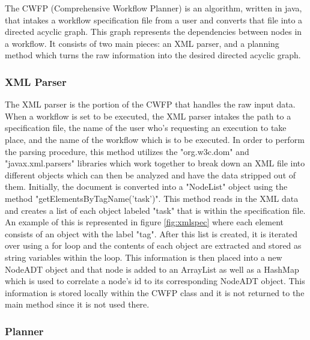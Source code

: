 \documentclass[fleqn,10pt]{SelfArx} %
\begin{document}
The CWFP (Comprehensive Workflow Planner) is an algorithm, written in java, that intakes a workflow specification file from a user and converts that file into a directed acyclic graph. This graph represents the dependencies between nodes in a workflow. It consists of two main pieces: an XML parser, and a planning method which turns the raw information into the desired directed acyclic graph.

\subsubsection{XML Parser}

The XML parser is the portion of the CWFP that handles the raw input data. When a workflow is set to be executed, the XML parser intakes the path to a specification file, the name of the user who's requesting an execution to take place, and the name of the workflow which is to be executed. In order to perform the parsing procedure, this method utilizes the "org.w3c.dom" and "javax.xml.parsers" libraries which work together to break down an XML file into different objects which can then be analyzed and have the data stripped out of them. Initially, the document is converted into a "NodeList" object using the method "getElementsByTagName('task')". This method reads in the XML data and creates a list of each object labeled "task" that is within the specification file. An example of this is represented in figure \ref{fig:xmlspec} where each element consists of an object with the label "tag". After this list is created, it is iterated over using a for loop and the contents of each object are extracted and stored as string variables within the loop. This information is then placed into a new NodeADT object and that node is added to an ArrayList as well as a HashMap which is used to correlate a node's id to its corresponding NodeADT object. This information is stored locally within the CWFP class and it is not returned to the main method since it is not used there.

\subsubsection{Planner}
\end{document}
